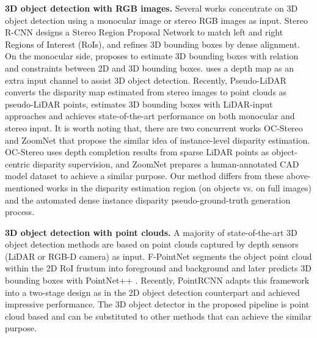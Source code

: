 \documentclass[10pt,twocolumn,letterpaper]{article}
\begin{document}
\medskip
\noindent\textbf{3D object detection with RGB images.}
Several works concentrate on 3D object detection using a monocular image or stereo RGB images as input.
Stereo R-CNN \cite{li2019stereo} designs a Stereo Region Proposal Network to match left and right Regions of Interest (RoIs), and refines 3D bounding boxes by dense alignment.
On the monocular side,
\cite{mousavian20173d} proposes to estimate 3D bounding boxes with relation and constraints between 2D and 3D bounding boxes.
\cite{xu2018multi} uses a depth map as an extra input channel to assist 3D object detection.
Recently, Pseudo-LiDAR \cite{wang2019pseudo} converts the disparity map estimated from stereo images to point clouds as pseudo-LiDAR points, estimates 3D bounding boxes with LiDAR-input approaches and achieves state-of-the-art performance on both monocular and stereo input.
It is worth noting that, there are two concurrent works OC-Stereo \cite{ponObjectCentricStereoMatching2019} and ZoomNet \cite{xu2020zoomnet} that propose the similar idea of instance-level disparity estimation. OC-Stereo \cite{ponObjectCentricStereoMatching2019} uses depth completion results from sparse LiDAR points as object-centric disparity supervision, and ZoomNet \cite{xu2020zoomnet} prepares a human-annotated CAD model dataset to achieve a similar purpose.
Our method differs from these above-mentioned works in the disparity estimation region (on objects vs. on full images) and the automated dense instance disparity pseudo-ground-truth generation process.

\medskip
\noindent\textbf{3D object detection with point clouds.}
A majority of state-of-the-art 3D object detection methods are based on point clouds captured by depth sensors (LiDAR or RGB-D camera) \cite{chen2017multi,qi2019deep} as input.
F-PointNet \cite{qi2018frustum} segments the object point cloud within the 2D RoI frustum into foreground and background and later predicts 3D bounding boxes with PointNet++ \cite{qi2017pointnet++}.
Recently, PointRCNN \cite{shi2019pointrcnn} adapts this framework into a two-stage design as in the 2D object detection counterpart \cite{ren2015faster} and achieved impressive performance.
The 3D object detector in the proposed pipeline is point cloud based and can be substituted to other methods that can achieve the similar purpose.
\end{document}
